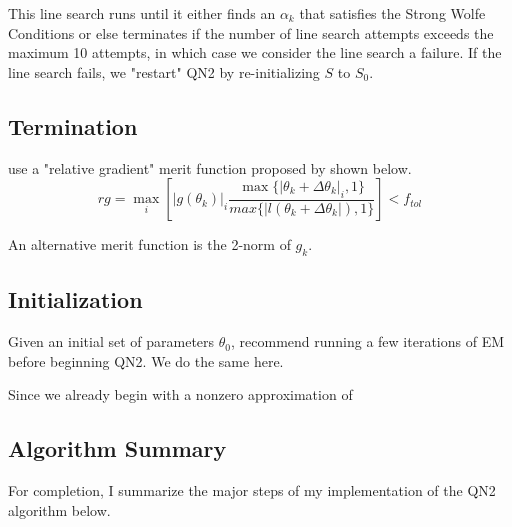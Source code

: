 \documentclass[letter,12pt]{article}
\begin{document}
This line search runs until it either finds an $\alpha_k$ that satisfies the Strong Wolfe Conditions or else terminates if the number of line search attempts exceeds the maximum 10 attempts, in which case we consider the line search a failure.  If the line search fails, we "restart" QN2 by re-initializing $S$ to $S_0$.

\subsection{Termination}

\cite{jamshidianj97} use a "relative gradient" merit function proposed by \cite{khalfan93} shown below.
\begin{equation} \label{eq:rg}
rg = \max_i
\left[
|g(\theta_k)|_i
\frac
{\max\{|\theta_k + \Delta \theta_k|_i,1\}}
{max\{|l(\theta_k + \Delta \theta_k|),1\}}
\right]
< f_{tol}
\end{equation}

An alternative merit function is the 2-norm of $g_k$.

\subsection{Initialization}

Given an initial set of parameters $\theta_0$, \cite{jamshidianj93} recommend running a few iterations of EM before beginning QN2.  We do the same here.

Since we already begin with a nonzero approximation of 

\subsection{Algorithm Summary}

For completion, I summarize the major steps of my implementation of the QN2 algorithm below.
\end{document}
